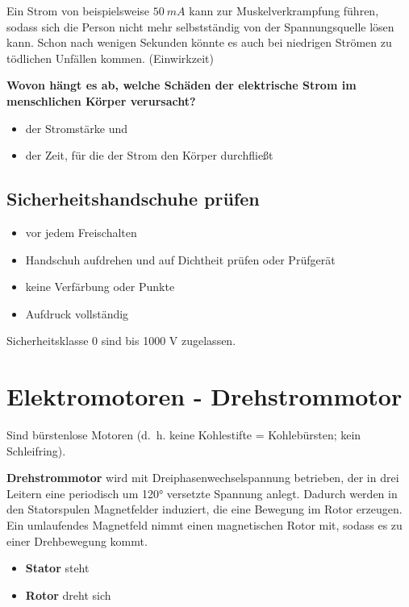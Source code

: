 Ein Strom von beispielsweise $50~mA$ kann zur Muskelverkrampfung
führen, sodass sich die Person nicht mehr selbstständig von der
Spannungsquelle lösen kann. Schon nach wenigen Sekunden könnte es auch
bei niedrigen Strömen zu tödlichen Unfällen kommen. (Einwirkzeit)

\textbf{Wovon hängt es ab, welche Schäden der elektrische Strom im
menschlichen Körper verursacht?}

\begin{itemize}
\item
  der Stromstärke und
\item
  der Zeit, für die der Strom den Körper durchfließt
\end{itemize}

\subsection{Sicherheitshandschuhe
prüfen}\label{sicherheitshandschuhe-pruefen}

\begin{itemize}
\item
  vor jedem Freischalten
\item
  Handschuh aufdrehen und auf Dichtheit prüfen oder Prüfgerät
\item
  keine Verfärbung oder Punkte
\item
  Aufdruck vollständig
\end{itemize}

Sicherheitsklasse 0 sind bis 1000 V zugelassen.

\section{Elektromotoren -
Drehstrommotor}\label{elektromotoren-drehstrommotor}

Sind bürstenlose Motoren (d.~h. keine Kohlestifte = Kohlebürsten; kein
Schleifring).

\textbf{Drehstrommotor} wird mit Dreiphasenwechselspannung betrieben,
der in drei Leitern eine periodisch um 120° versetzte Spannung anlegt.
Dadurch werden in den Statorspulen Magnetfelder induziert, die eine
Bewegung im Rotor erzeugen. Ein umlaufendes Magnetfeld nimmt einen
magnetischen Rotor mit, sodass es zu einer Drehbewegung kommt.

\begin{itemize}
\item
  \textbf{Stator} steht
\item
  \textbf{Rotor} dreht sich
\end{itemize}

